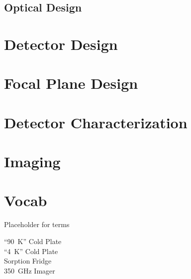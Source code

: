 \documentclass[10pt,twocolumn,article]{memoir}
\begin{document}
\section{Optical Design}\label{s-optical-design}


\chapter{Detector Design}\label{c:det-design}

\chapter{Focal Plane Design}\label{c:fp-design}

\chapter{Detector Characterization}\label{c:det-char}

\chapter{Imaging}\label{c:imaging}

\chapter{Vocab}

Placeholder for terms

\begin{description}
\item[``90~K'' Cold Plate]
\item[``4~K'' Cold Plate]
\item[Sorption Fridge]
\item[350~GHz Imager]

\end{description}

\printbibliography
\end{document}
